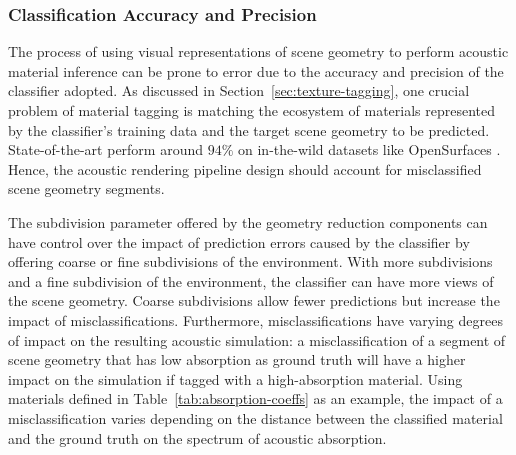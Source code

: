 \subsubsection{Classification Accuracy and Precision}
The process of using visual representations of scene geometry to perform acoustic material inference can be prone to error due to the accuracy and precision of the classifier adopted. As discussed in Section~\ref{sec:texture-tagging}, one crucial problem of material tagging is matching the ecosystem of materials represented by the classifier's training data and the target scene geometry to be predicted. State-of-the-art  perform around $94\%$ on in-the-wild datasets like OpenSurfaces \citep{he2016deep, bell2013opensurfaces}. Hence, the acoustic rendering pipeline design should account for misclassified scene geometry segments.\par
The subdivision parameter offered by the geometry reduction components can have control over the impact of prediction errors caused by the classifier by offering coarse or fine subdivisions of the environment. With more subdivisions and a fine subdivision of the environment, the classifier can have more views of the scene geometry. Coarse subdivisions allow fewer predictions but increase the impact of misclassifications. Furthermore, misclassifications have varying degrees of impact on the resulting acoustic simulation: a misclassification of a segment of scene geometry that has low absorption as ground truth will have a higher impact on the simulation if tagged with a high-absorption material. Using materials defined in Table~\ref{tab:absorption-coeffs} as an example, the impact of a misclassification varies depending on the distance between the classified material and the ground truth on the spectrum of acoustic absorption.

